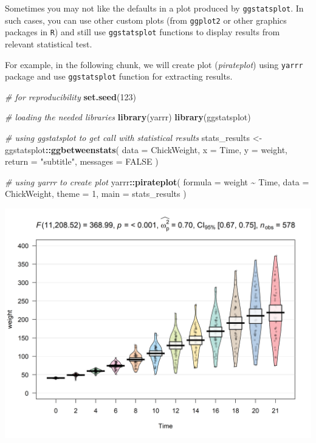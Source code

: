 \documentclass[
]{article}
\newenvironment{Shaded}{\begin{snugshade}}{\end{snugshade}}
\newcommand{\CommentTok}[1]{\textcolor[rgb]{0.56,0.35,0.01}{\textit{#1}}}
\newcommand{\DataTypeTok}[1]{\textcolor[rgb]{0.13,0.29,0.53}{#1}}
\newcommand{\DecValTok}[1]{\textcolor[rgb]{0.00,0.00,0.81}{#1}}
\newcommand{\KeywordTok}[1]{\textcolor[rgb]{0.13,0.29,0.53}{\textbf{#1}}}
\newcommand{\NormalTok}[1]{#1}
\newcommand{\OperatorTok}[1]{\textcolor[rgb]{0.81,0.36,0.00}{\textbf{#1}}}
\newcommand{\OtherTok}[1]{\textcolor[rgb]{0.56,0.35,0.01}{#1}}
\newcommand{\StringTok}[1]{\textcolor[rgb]{0.31,0.60,0.02}{#1}}
\begin{document}
Sometimes you may not like the defaults in a plot produced by \texttt{ggstatsplot}. In
such cases, you can use other custom plots (from \texttt{ggplot2} or other graphics
packages in \texttt{R}) and still use \texttt{ggstatsplot} functions to display results from relevant
statistical test.

For example, in the following chunk, we will create plot (\emph{pirateplot}) using
\texttt{yarrr} package and use \texttt{ggstatsplot} function for extracting results.

\begin{Shaded}
\begin{Highlighting}[]
\CommentTok{\# for reproducibility}
\KeywordTok{set.seed}\NormalTok{(}\DecValTok{123}\NormalTok{)}

\CommentTok{\# loading the needed libraries}
\KeywordTok{library}\NormalTok{(yarrr)}
\KeywordTok{library}\NormalTok{(ggstatsplot)}

\CommentTok{\# using \textasciigrave{}ggstatsplot\textasciigrave{} to get call with statistical results}
\NormalTok{stats\_results <{-}}
\StringTok{  }\NormalTok{ggstatsplot}\OperatorTok{::}\KeywordTok{ggbetweenstats}\NormalTok{(}
    \DataTypeTok{data =}\NormalTok{ ChickWeight,}
    \DataTypeTok{x =}\NormalTok{ Time,}
    \DataTypeTok{y =}\NormalTok{ weight,}
    \DataTypeTok{return =} \StringTok{"subtitle"}\NormalTok{,}
    \DataTypeTok{messages =} \OtherTok{FALSE}
\NormalTok{  )}

\CommentTok{\# using \textasciigrave{}yarrr\textasciigrave{} to create plot}
\NormalTok{yarrr}\OperatorTok{::}\KeywordTok{pirateplot}\NormalTok{(}
  \DataTypeTok{formula =}\NormalTok{ weight }\OperatorTok{\textasciitilde{}}\StringTok{ }\NormalTok{Time,}
  \DataTypeTok{data =}\NormalTok{ ChickWeight,}
  \DataTypeTok{theme =} \DecValTok{1}\NormalTok{,}
  \DataTypeTok{main =}\NormalTok{ stats\_results}
\NormalTok{)}
\end{Highlighting}
\end{Shaded}

\includegraphics[width=1\linewidth]{./figures/paper-pirateplot-1}
\end{document}
